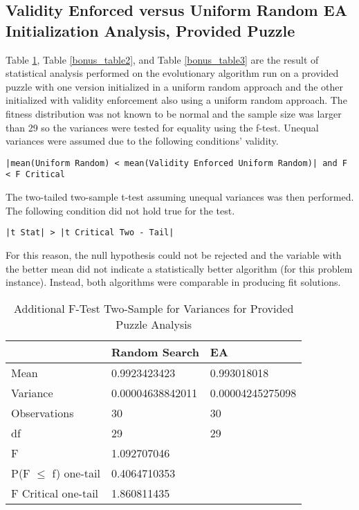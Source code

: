 \documentclass[11pt]{article}
\begin{document}
\subsection{Validity Enforced versus Uniform Random EA Initialization Analysis, Provided Puzzle}

Table \ref{bonus_table1}, Table \ref{bonus_table2}, and Table \ref{bonus_table3} are the result of statistical analysis performed on the 
evolutionary algorithm run on a provided puzzle with one version initialized in a 
uniform random approach and the other initialized with validity enforcement also using 
a uniform random approach. The fitness distribution was not known to be normal 
and the sample size was larger than 29 so the variances were tested for 
equality using the f-test. Unequal variances were assumed due to the following 
conditions' validity.

\begin{center}
\texttt{|mean(Uniform Random) < mean(Validity Enforced Uniform Random)| and F < F Critical}
\end{center}

The two-tailed two-sample t-test assuming unequal variances was then performed. The following condition did not hold true for the test.

\begin{center}
\texttt{|t Stat| > |t Critical Two - Tail|}
\end{center}

For this reason, the null hypothesis could not be rejected and the variable with the better mean did not indicate a statistically better algorithm (for this problem instance). Instead, both algorithms were comparable in producing fit solutions.


\begin{table}[H]
\centering
\caption{Additional F-Test Two-Sample for Variances for Provided Puzzle Analysis}
\label{bonus_table1}
\begin{tabular}{l|l|l}
 & Random Search & EA \\ \hline
Mean & 0.9923423423 & 0.993018018 \\
Variance & 0.00004638842011 & 0.00004245275098 \\
Observations & 30 & 30 \\
df & 29 & 29 \\
F & 1.092707046 &  \\
P(F $\leq$ f) one-tail & 0.4064710353 &  \\
F Critical one-tail & 1.860811435 & 
\end{tabular}
\end{table}
\end{document}
